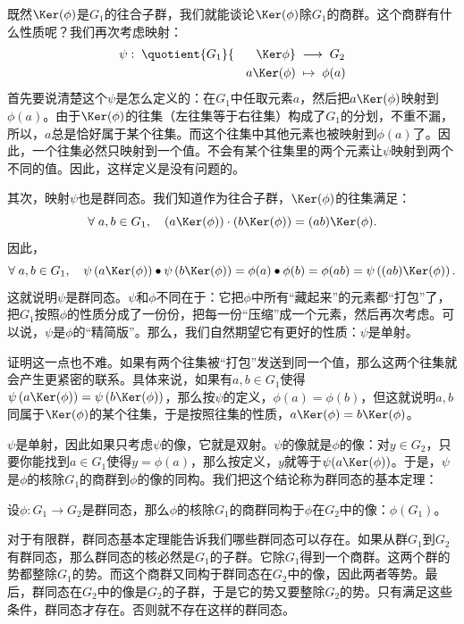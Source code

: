 \documentclass[12pt,UTF8,fontset=none]{ctexbook}
\begin{document}
既然$\Ker(\phi)$是$G_1$的往合子群，我们就能谈论$\Ker(\phi)$除$G_1$的商群。这个商群有什么性质呢？我们再次考虑映射：
\begin{align*}
    \psi:\; \quotient{G_1}{\phantom{mm}\Ker\phi} \;&\longrightarrow \; G_2 \\
           a\Ker(\phi) \;&\mapsto \; \phi(a)
\end{align*}
首先要说清楚这个$\psi$是怎么定义的：在$G_1$中任取元素$a$，然后把$a\Ker(\phi)$映射到$\phi(a)$。由于$\Ker(\phi)$的往集（左往集等于右往集）构成了$G_1$的分划，不重不漏，所以，$a$总是恰好属于某个往集。而这个往集中其他元素也被映射到$\phi(a)$了。因此，一个往集必然只映射到一个值。不会有某个往集里的两个元素让$\psi$映射到两个不同的值。因此，这样定义是没有问题的。

其次，映射$\psi$也是群同态。我们知道作为往合子群，$\Ker(\phi)$的往集满足：
$$ \forall \; a,b\in G_1,\quad \left(a\Ker(\phi)\right)\cdot\left(b\Ker(\phi)\right) = (ab)\Ker(\phi). $$
因此，
$$ \forall \; a,b\in G_1, \quad\psi\left(a\Ker(\phi)\right)\bullet\psi\left(b\Ker(\phi)\right) = \phi(a)\bullet\phi(b) = \phi(ab) = \psi\left((ab)\Ker(\phi)\right).
$$
这就说明$\psi$是群同态。$\psi$和$\phi$不同在于：它把$\phi$中所有“藏起来”的元素都“打包”了，把$G_1$按照$\phi$的性质分成了一份份，把每一份“压缩”成一个元素，然后再次考虑。可以说，$\psi$是$\phi$的“精简版”。那么，我们自然期望它有更好的性质：$\psi$是单射。

证明这一点也不难。如果有两个往集被“打包”发送到同一个值，那么这两个往集就会产生更紧密的联系。具体来说，如果有$a,b\in G_1$使得$\psi\left(a\Ker(\phi)\right) = \psi\left(b\Ker(\phi)\right)$，那么按$\psi$的定义，$\phi(a) = \phi(b)$，但这就说明$a,b$同属于$\Ker(\phi)$的某个往集，于是按照往集的性质，$a\Ker(\phi) = b\Ker(\phi)$。

$\psi$是单射，因此如果只考虑$\psi$的像，它就是双射。$\psi$的像就是$\phi$的像：对$y\in G_2$，只要你能找到$a\in G_1$使得$y=\phi(a)$，那么按定义，$y$就等于$\psi(a\Ker(\phi))$。于是，$\psi$是$\phi$的核除$G_1$的商群到$\phi$的像的同构。我们把这个结论称为群同态的基本定理：
\begin{tm}[群同态基本定理]
    设$\phi: G_1\rightarrow G_2$是群同态，那么$\phi$的核除$G_1$的商群同构于$\phi$在$G_2$中的像：$\phi(G_1)$。
\end{tm}

对于有限群，群同态基本定理能告诉我们哪些群同态可以存在。如果从群$G_1$到$G_2$有群同态，那么群同态的核必然是$G_1$的子群。它除$G_1$得到一个商群。这两个群的势都整除$G_1$的势。而这个商群又同构于群同态在$G_2$中的像，因此两者等势。最后，群同态在$G_2$中的像是$G_2$的子群，于是它的势又要整除$G_2$的势。只有满足这些条件，群同态才存在。否则就不存在这样的群同态。
\end{document}

